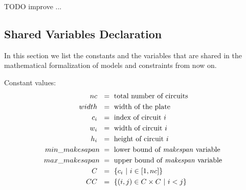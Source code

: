     \colorbox{BurntOrange}{TODO improve ...}


\subsection{Shared Variables Declaration} \label{sec:shared_variables}
    In this section we list the constants and the variables that are shared in the mathematical formalization of 
    models and constraints from now on.

    Constant values:
    \begin{align*}
        nc\             &\ =\ \text{total number of circuits}                   \\
        width\          &\ =\ \text{width of the plate}                         \\
        c_i\            &\ =\ \text{index of circuit  } i                       \\
        w_i\            &\ =\ \text{width of circuit  } i                       \\
        h_i\            &\ =\ \text{height of circuit  } i                      \\
        min\_makesapan  &\ =\ \text{lower bound of \textit{makespan} variable}  \\
        max\_makesapan  &\ =\ \text{upper bound of \textit{makespan} variable}  \\
        C\              &\ =\ \{ c_i\ |\ i \in [1, nc]\}                         \\        
        CC\             &\ =\ \{(i, j) \in C \times C\ |\ i<j \}
    \end{align*}

